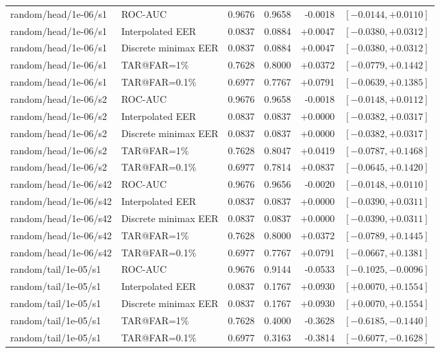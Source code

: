 \documentclass[journal]{IEEEtran}
\begin{document}
\begin{table}[!t]
\begin{tabular}{@{}llrrrr@{}}
random/head/1e-06/s1 & ROC-AUC & 0.9676 & 0.9658 & -0.0018 & $[-0.0144,+0.0110]$ \\
random/head/1e-06/s1 & Interpolated EER & 0.0837 & 0.0884 & +0.0047 & $[-0.0380,+0.0312]$ \\
random/head/1e-06/s1 & Discrete minimax EER & 0.0837 & 0.0884 & +0.0047 & $[-0.0380,+0.0312]$ \\
random/head/1e-06/s1 & TAR@FAR=1\% & 0.7628 & 0.8000 & +0.0372 & $[-0.0779,+0.1442]$ \\
random/head/1e-06/s1 & TAR@FAR=0.1\% & 0.6977 & 0.7767 & +0.0791 & $[-0.0639,+0.1385]$ \\
random/head/1e-06/s2 & ROC-AUC & 0.9676 & 0.9658 & -0.0018 & $[-0.0148,+0.0112]$ \\
random/head/1e-06/s2 & Interpolated EER & 0.0837 & 0.0837 & +0.0000 & $[-0.0382,+0.0317]$ \\
random/head/1e-06/s2 & Discrete minimax EER & 0.0837 & 0.0837 & +0.0000 & $[-0.0382,+0.0317]$ \\
random/head/1e-06/s2 & TAR@FAR=1\% & 0.7628 & 0.8047 & +0.0419 & $[-0.0787,+0.1468]$ \\
random/head/1e-06/s2 & TAR@FAR=0.1\% & 0.6977 & 0.7814 & +0.0837 & $[-0.0645,+0.1420]$ \\
random/head/1e-06/s42 & ROC-AUC & 0.9676 & 0.9656 & -0.0020 & $[-0.0148,+0.0110]$ \\
random/head/1e-06/s42 & Interpolated EER & 0.0837 & 0.0837 & +0.0000 & $[-0.0390,+0.0311]$ \\
random/head/1e-06/s42 & Discrete minimax EER & 0.0837 & 0.0837 & +0.0000 & $[-0.0390,+0.0311]$ \\
random/head/1e-06/s42 & TAR@FAR=1\% & 0.7628 & 0.8000 & +0.0372 & $[-0.0789,+0.1445]$ \\
random/head/1e-06/s42 & TAR@FAR=0.1\% & 0.6977 & 0.7767 & +0.0791 & $[-0.0667,+0.1381]$ \\
random/tail/1e-05/s1 & ROC-AUC & 0.9676 & 0.9144 & -0.0533 & $[-0.1025,-0.0096]$ \\
random/tail/1e-05/s1 & Interpolated EER & 0.0837 & 0.1767 & +0.0930 & $[+0.0070,+0.1554]$ \\
random/tail/1e-05/s1 & Discrete minimax EER & 0.0837 & 0.1767 & +0.0930 & $[+0.0070,+0.1554]$ \\
random/tail/1e-05/s1 & TAR@FAR=1\% & 0.7628 & 0.4000 & -0.3628 & $[-0.6185,-0.1440]$ \\
random/tail/1e-05/s1 & TAR@FAR=0.1\% & 0.6977 & 0.3163 & -0.3814 & $[-0.6077,-0.1628]$ \\

\end{tabular}
\end{table}
\end{document}
